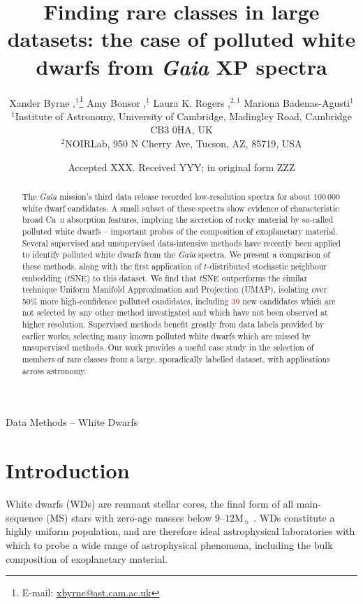 \documentclass[fleqn,usenatbib]{rasti}
\title[
    Polluted white dwarfs from \textit{Gaia} XP spectra
]{
    Finding rare classes in large datasets: the case of polluted white dwarfs from \textit{Gaia} XP spectra
}
\author[
    X. Byrne et al.
]{
    Xander Byrne
    \orcidlink{0000-0001-9488-238X},$^{1}$\thanks{E-mail: \href{mailto:xbyrne@ast.cam.ac.uk}{xbyrne@ast.cam.ac.uk}}
    Amy Bonsor
    \orcidlink{0000-0002-8070-1901},$^{1}$
    Laura K. Rogers
    \orcidlink{0000-0002-3553-9474},$^{2,1}$
    Mariona Badenas-Agusti$^{1}$
    \orcidlink{0000-0003-4903-567X}
\\
$^{1}$Institute of Astronomy, University of Cambridge, Madingley Road, Cambridge CB3 0HA, UK\\
$^{2}$NOIRLab, 950 N Cherry Ave, Tucson, AZ, 85719, USA\\
}
\date{Accepted XXX. Received YYY; in original form ZZZ}
\newcommand{\red}[1]{\textcolor{red}{#1}}
\begin{document}
\label{firstpage}
\pagerange{\pageref{firstpage}--\pageref{lastpage}}
\maketitle

\begin{abstract}
The \textit{Gaia} mission's third data release recorded low-resolution spectra for about $100\,000$ white dwarf candidates.
A small subset of these spectra show evidence of characteristic broad Ca~\textsc{ii} absorption features, implying the accretion of rocky material by so-called polluted white dwarfs -- important probes of the composition of exoplanetary material.
Several supervised and unsupervised data-intensive methods have recently been applied to identify polluted white dwarfs from the \textit{Gaia} spectra.
We present a comparison of these methods, along with the first application of $t$-distributed stochastic neighbour embedding ($t$SNE) to this dataset.
We find that $t$SNE outperforms the similar technique Uniform Manifold Approximation and Projection (UMAP), isolating over 50\% more high-confidence polluted candidates, including \red{39} new candidates which are not selected by any other method investigated and which have not been observed at higher resolution.
Supervised methods benefit greatly from data labels provided by earlier works, selecting many known polluted white dwarfs which are missed by unsupervised methods.
Our work provides a useful case study in the selection of members of rare classes from a large, sporadically labelled dataset, with applications across astronomy.
\end{abstract}

\begin{keywords}
Data Methods -- White Dwarfs
\end{keywords}



\section{Introduction}

White dwarfs (WDs) are remnant stellar cores, the final form of all main-sequence (MS) stars with zero-age masses below $9$--$12\mathrm{M}_{\sun}$ \citep{althaus10, althaus21, lauffer18}.
WDs constitute a highly uniform population, and are therefore ideal astrophysical laboratories with which to probe a wide range of astrophysical phenomena, including the bulk composition of exoplanetary material.
\end{document}

